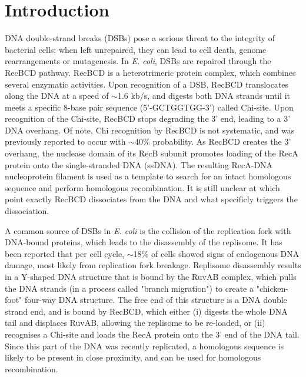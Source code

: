 \section*{Introduction}

DNA double-strand breaks (DSBs) pose a serious threat to the integrity of bacterial cells: when left unrepaired, they can lead to cell death, genome rearrangements or mutagenesis. In \emph{E. coli}, DSBs are repaired through the RecBCD pathway. RecBCD is a heterotrimeric protein complex, which combines several enzymatic activities\cite{Dillingham2008}. Upon recognition of a DSB, RecBCD translocates along the DNA at a speed of $\sim$1.6 kb/s\cite{Wiktor2018}, and digests both DNA strands until it meets a specific 8-base pair sequence (5'-GCTGGTGG-3') called Chi-site. Upon recognition of the Chi-site, RecBCD stops degrading the 3' end, leading to a 3' DNA overhang. Of note, Chi recognition by RecBCD is not systematic, and was previously reported to occur with $\sim$40\% probability\cite{Taylor1992,Cockram2015}. As RecBCD creates the 3' overhang, the nuclease domain of its RecB subunit promotes loading of the RecA protein onto the single-stranded DNA (ssDNA)\cite{Churchill2000, Spies2006}. The resulting RecA-DNA nucleoprotein filament is used as a template to search for an intact homologous sequence and perform homologous recombination. It is still unclear at which point exactly RecBCD dissociates from the DNA and what specificly triggers the dissociation.

A common source of DSBs in \emph{E. coli} is the collision of the replication fork with DNA-bound proteins, which leads to the disassembly of the replisome\cite{Michel1997}. It has been reported that per cell cycle, $\sim$18\% of cells showed signs of endogenous DNA damage, most likely from replication fork breakage\cite{Sinha2018}. Replisome disassembly results in a Y-shaped DNA structure that is bound by the RuvAB complex, which pulls the DNA strands (in a process called "branch migration") to create a "chicken-foot" four-way DNA structure\cite{Seigneur1998}. The free end of this structure is a DNA double strand end, and is bound by RecBCD, which either (i) digests the whole DNA tail and displaces RuvAB, allowing the replisome to be re-loaded, or (ii) recognises a Chi-site and loads the RecA protein onto the 3' end of the DNA tail\cite{Michel2001}. Since this part of the DNA was recently replicated, a homologous sequence is likely to be present in close proximity, and can be used for homologous recombination.

